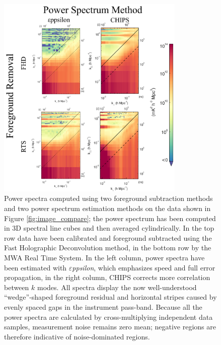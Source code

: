 \documentclass[twolcolumn,iop]{emulateapj}
\def\eppsilon{{\it $\varepsilon$ppsilon}}
\begin{document}
\begin{figure}[htbp]
\begin{center}
\includegraphics[width=0.8\textwidth]{figures/MWA_PS_compare/MWA_PS_compare.png}
\caption{Power spectra computed using two foreground subtraction methods and two power spectrum estimation methods on the data shown in Figure \ref{fig:image_compare}; the power spectrum has been computed in 3D spectral line cubes and then averaged cylindrically.  In the top row data have been calibrated and foreground subtracted using the Fast Holographic Deconvolution method, in the bottom row by the MWA Real Time System.  In the left column, power spectra have been estimated with \eppsilon{}, which emphasizes speed and full error propagation, in the right column, CHIPS corrects more correlation between $k$ modes.  All spectra display the now well-understood ``wedge''-shaped foreground residual and horizontal stripes caused by evenly spaced gaps in the instrument pass-band. Because all the power spectra are calculated by cross-multiplying independent data samples, measurement noise remains zero mean; negative regions are therefore indicative of noise-dominated regions.   \label{fig:pspec_compare}}
\end{center}
\end{figure}
\end{document}
